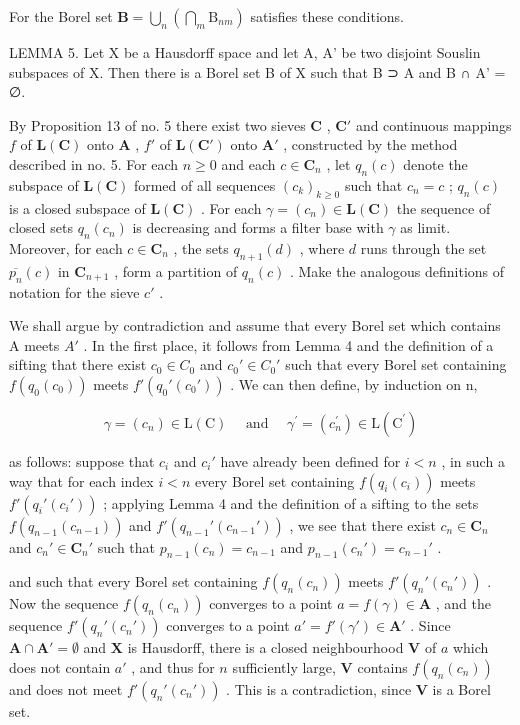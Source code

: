 For the Borel set \(\mathbf{B} = \bigcup_{n}\left(\bigcap_{m}\mathrm{B}_{nm}\right)\) satisfies these conditions.

LEMMA 5. Let X be a Hausdorff space and let A, A' be two disjoint Souslin subspaces of X. Then there is a Borel set B of X such that B ⊃ A and B ∩ A' = ∅.

By Proposition 13 of no. 5 there exist two sieves \(\mathbf{C}\) , \(\mathbf{C}'\) and continuous mappings \(f\) of \(\mathbf{L}(\mathbf{C})\) onto \(\mathbf{A}\) , \(f'\) of \(\mathbf{L}(\mathbf{C}')\) onto \(\mathbf{A}'\) , constructed by the method described in no. 5. For each \(n \geqslant 0\) and each \(c \in \mathbf{C}_n\) , let \(q_n(c)\) denote the subspace of \(\mathbf{L}(\mathbf{C})\) formed of all sequences \((c_k)_{k \geqslant 0}\) such that \(c_n = c\) ; \(q_n(c)\) is a closed subspace of \(\mathbf{L}(\mathbf{C})\) . For each \(\gamma = (c_n) \in \mathbf{L}(\mathbf{C})\) the sequence of closed sets \(q_n(c_n)\) is decreasing and forms a filter base with \(\gamma\) as limit. Moreover, for each \(c \in \mathbf{C}_n\) , the sets \(q_{n+1}(d)\) , where \(d\) runs through the set \(\overline{p_n}(c)\) in \(\mathbf{C}_{n+1}\) , form a partition of \(q_n(c)\) . Make the analogous definitions of notation for the sieve \(c'\) .

We shall argue by contradiction and assume that every Borel set which contains A meets \(A'\) . In the first place, it follows from Lemma 4 and the definition of a sifting that there exist \(c_{0} \in C_{0}\) and \(c_{0}' \in C_{0}'\) such that every Borel set containing \(f(q_{0}(c_{0}))\) meets \(f'(q_{0}'(c_{0}'))\) . We can then define, by induction on n,

\[
\gamma = (c _ {n}) \in \mathrm{L} (\mathrm{C}) \quad \text { and } \quad \gamma^ {\prime} = (c _ {n} ^ {\prime}) \in \mathrm{L} (\mathrm{C} ^ {\prime})
\]

as follows: suppose that \(c_i\) and \(c_i'\) have already been defined for \(i < n\) , in such a way that for each index \(i < n\) every Borel set containing \(f(q_i(c_i))\) meets \(f'(q_i'(c_i'))\) ; applying Lemma 4 and the definition of a sifting to the sets \(f(q_{n-1}(c_{n-1}))\) and \(f'(q_{n-1}'(c_{n-1}'))\) , we see that there exist \(c_n \in \mathbf{C}_n\) and \(c_n' \in \mathbf{C}_n'\) such that \(p_{n-1}(c_n) = c_{n-1}\) and \(p_{n-1}(c_n') = c_{n-1}'\) .

and such that every Borel set containing \(f(q_n(c_n))\) meets \(f'(q_n'(c_n'))\) . Now the sequence \(f(q_n(c_n))\) converges to a point \(a = f(\gamma) \in \mathbf{A}\) , and the sequence \(f'(q_n'(c_n'))\) converges to a point \(a' = f'(\gamma') \in \mathbf{A}'\) . Since \(\mathbf{A} \cap \mathbf{A}' = \emptyset\) and \(\mathbf{X}\) is Hausdorff, there is a closed neighbourhood \(\mathbf{V}\) of \(a\) which does not contain \(a'\) , and thus for \(n\) sufficiently large, \(\mathbf{V}\) contains \(f(q_n(c_n))\) and does not meet \(f'(q_n'(c_n'))\) . This is a contradiction, since \(\mathbf{V}\) is a Borel set.

